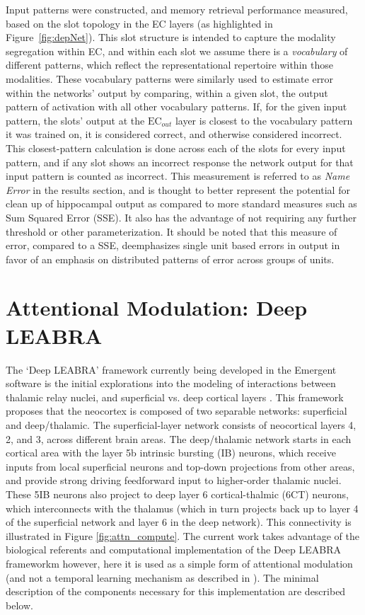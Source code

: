 \documentclass[11pt, titlepage, twoside]{article}
\begin{document}

Input patterns were constructed, and memory retrieval performance measured, based on the slot topology in the EC layers (as highlighted in Figure~\ref{fig:depNet}).  This slot structure is intended to capture the modality segregation within EC, and within each slot we assume there is a {\em vocabulary} of different patterns, which reflect the representational repertoire within those modalities.  These vocabulary patterns were similarly used to estimate error within the networks' output by comparing, within a given slot, the output pattern of activation with all other vocabulary patterns.  If, for the given input pattern, the slots' output at the $\mathrm{EC}_{out}$ layer is closest to the vocabulary pattern it was trained on, it is considered correct, and otherwise considered incorrect.  This closest-pattern calculation is done across each of the slots for every input pattern, and if any slot shows an incorrect response the network output for that input pattern is counted as incorrect.  This measurement is referred to as \emph{Name Error} in the results section, and is thought to better represent the potential for clean up of hippocampal output as compared to more standard measures such as Sum Squared Error (SSE).    It also has the advantage of not requiring any further threshold or other parameterization.  It should be noted that this measure of error, compared to a SSE, deemphasizes single unit based errors in output in favor of an emphasis on distributed patterns of error across groups of units.


\section{Attentional Modulation: Deep LEABRA}
\label{appDeepLeabra}

The `Deep LEABRA' framework currently being developed in the Emergent software is the initial explorations into the modeling of interactions between thalamic relay nuclei, and superficial vs. deep cortical layers \parencite{OReillyWyatteRohrlich14}.  This framework proposes that the neocortex is composed of two separable networks: superficial and deep/thalamic. The superficial-layer network consists of neocortical layers 4, 2, and 3, across different brain areas.  The deep/thalamic network starts in each cortical area with the layer 5b intrinsic bursting (IB) neurons, which receive inputs from local superficial neurons and top-down projections from other areas, and provide strong driving feedforward input to higher-order thalamic nuclei. These 5IB neurons also project to deep layer 6 cortical-thalmic (6CT) neurons, which interconnects with the thalamus (which in turn projects back up to layer 4 of the superficial network and layer 6 in the deep network).  This connectivity is illustrated in Figure \ref{fig:attn_compute}.  The current work takes advantage of the biological referents and computational implementation of the Deep LEABRA frameworkm however, here it is used as a simple form of attentional modulation (and not a temporal learning mechanism as described in \textcite{OReillyWyatteRohrlich14}).  The minimal description of the components necessary for this implementation are described below.  
\end{document}
